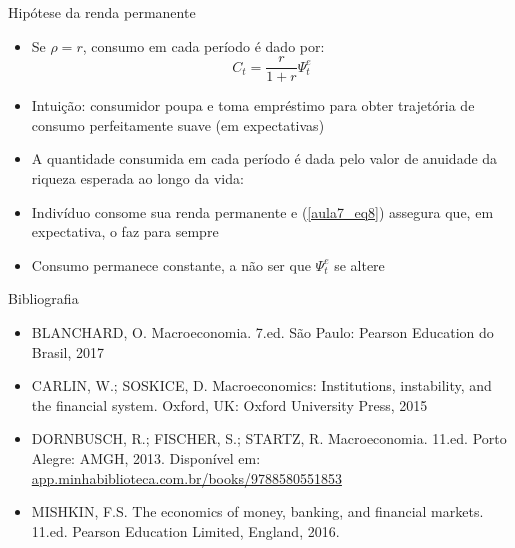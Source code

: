 \documentclass[10pt]{beamer}
\begin{document}
\begin{frame}
    {Hipótese da renda permanente}
    \begin{itemize}
        \item Se $\rho = r$, consumo em cada período é dado por:
        \begin{equation}
            C_t = \frac{r}{1 + r}\Psi_t^e\label{aula7_eq8}
        \end{equation}
        \item Intuição: consumidor poupa e toma empréstimo para obter trajetória de consumo perfeitamente suave (em expectativas)\bigskip
        \item A quantidade consumida em cada período é dada pelo valor de anuidade da riqueza esperada ao longo da vida: \bigskip
        \item Indivíduo consome sua renda permanente e (\ref{aula7_eq8}) assegura que, em expectativa, o faz para sempre\bigskip
        \item Consumo permanece constante, a não ser que $\Psi_t^e$ se altere
    \end{itemize}
\end{frame}


\begin{frame}{ Bibliografia}
    \begin{itemize}
        \item BLANCHARD, O. Macroeconomia. 7.ed. São Paulo: Pearson Education do Brasil, 2017\medskip        
        \item CARLIN, W.; SOSKICE, D. Macroeconomics: Institutions, instability, and the financial system. Oxford, UK: Oxford University Press, 2015\medskip
        \item DORNBUSCH, R.; FISCHER, S.; STARTZ, R. Macroeconomia. 11.ed. Porto Alegre: AMGH, 2013. Disponível em: \href{https://app.minhabiblioteca.com.br/books/9788580551853}{app.minhabiblioteca.com.br/books/9788580551853}\medskip
        \item MISHKIN, F.S. The economics of money, banking, and financial markets. 11.ed. Pearson Education Limited, England, 2016.
    \end{itemize}
\end{frame}
\end{document}
